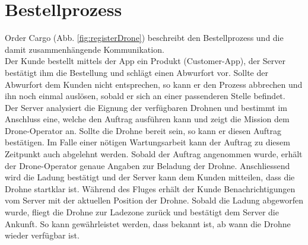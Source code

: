 {\section{Bestellprozess}

Order Cargo (Abb. \ref{fig:registerDrone}) beschreibt den Bestellprozess und die damit zusammenhängende Kommunikation. \\

Der Kunde bestellt mittels der App ein Produkt (Customer-App), der Server bestätigt ihm die Bestellung und schlägt einen Abwurfort vor. Sollte der Abwurfort dem Kunden nicht entsprechen, so kann er den Prozess abbrechen und ihn noch einmal auslösen, sobald er sich an einer passenderen Stelle befindet.\\

Der Server analysiert die Eignung der verfügbaren Drohnen und bestimmt im Anschluss eine, welche den Auftrag ausführen kann und zeigt die Mission dem Drone-Operator an. Sollte die Drohne bereit sein, so kann er diesen Auftrag bestätigen. Im Falle einer nötigen Wartungsarbeit kann der Auftrag zu diesem Zeitpunkt auch abgelehnt werden. Sobald der Auftrag angenommen wurde, erhält der Drone-Operator genaue Angaben zur Beladung der Drohne. Anschliessend wird die Ladung bestätigt und der Server kann dem Kunden mitteilen, dass die Drohne startklar ist. Während des Fluges erhält der Kunde Benachrichtigungen vom Server mit der aktuellen Position der Drohne. Sobald die Ladung abgeworfen wurde, fliegt die Drohne zur Ladezone zurück und bestätigt dem Server die Ankunft. So kann gewährleistet werden, dass bekannt ist, ab wann die Drohne wieder verfügbar ist. \\

}
